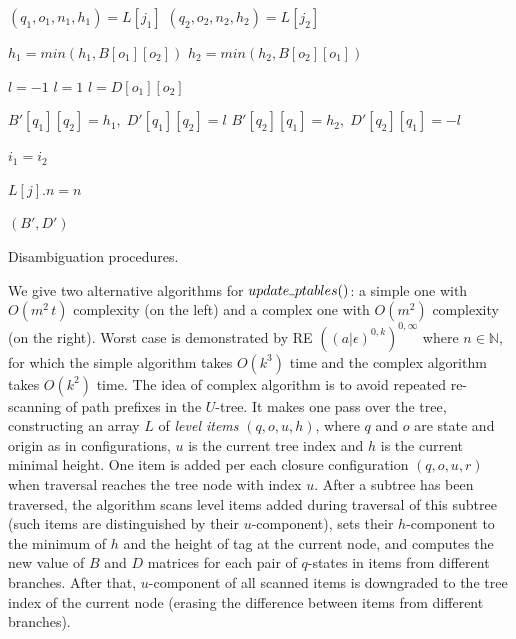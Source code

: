 \documentclass[AMA,STIX1COL]{WileyNJD-v2}
\newcommand{\Xund}{\rule{.4em}{.4pt}}
\newcommand{\YN}{\mathbb{N}}
\begin{document}
\begin{algorithm}[H]
\begin{multicols}{2}
{{{{                    \BlankLine
                     {
                        $(q_1, o_1, n_1, h_1) = L[j_1]$ \;
                        $(q_2, o_2, n_2, h_2) = L[j_2]$ \;

                        \BlankLine
                         {
                            $h_1 = min(h_1, B[o_1][o_2])$ \;
                            $h_2 = min(h_2, B[o_2][o_1])$ \;
                        }

                        \BlankLine
                            {$l = -1$}
                            {$l = 1$ }
                         {$l = D[o_1][o_2]$}
                    }

                    \BlankLine
                    $B'[q_1][q_2] = h_1, \; D'[q_1][q_2] = l$ \;
                    $B'[q_2][q_1] = h_2, \; D'[q_2][q_1] = -l$ \;
                }

                $i_1 = i_2$ \;
            }

            \BlankLine
             {
                $L[j].n = n$
            }
        }

        \BlankLine
        \Return $(B', D')$ \;
    }

\end{multicols}
\caption{Disambiguation procedures.}
\end{algorithm}
\medskip

We give two alternative algorithms for $update \Xund ptables ()$:
a simple one with $O(m^2 \, t)$ complexity (on the left) and a complex one with $O(m^2)$ complexity (on the right).
Worst case is demonstrated by RE $((a|\epsilon)^{0,k})^{0,\infty}$ where $n \in \YN$,
for which the simple algorithm takes $O(k^3)$ time and the complex algorithm takes $O(k^2)$ time.
%
The idea of complex algorithm is to avoid repeated re-scanning of path prefixes in the $U$-tree.
It makes one pass over the tree,
constructing an array $L$ of \emph{level items} $(q, o, u, h)$, where
$q$ and $o$ are state and origin as in configurations,
$u$ is the current tree index and $h$ is the current minimal height.
One item is added per each closure configuration $(q, o, u, r)$ when traversal reaches the tree node with index $u$.
After a subtree has been traversed,
the algorithm scans level items added during traversal of this subtree (such items are distinguished by their $u$-component),
sets their $h$-component to the minimum of $h$ and the height of tag at the current node,
and computes the new value of $B$ and $D$ matrices for each pair of $q$-states in items from different branches.
After that, $u$-component of all scanned items is downgraded to the tree index of the current node
(erasing the difference between items from different branches).
\end{document}
